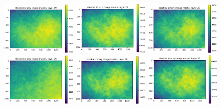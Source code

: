 \documentclass[letterpaper,11pt]{article}
\begin{document}
\begin{figure}[!ht]
\includegraphics[width=0.32\textwidth]{images/measuring_flatfield_corrections/mask_stack_layers_vectra/mask_stack_layer_19}
\includegraphics[width=0.32\textwidth]{images/measuring_flatfield_corrections/mask_stack_layers_vectra/mask_stack_layer_22}
\includegraphics[width=0.32\textwidth]{images/measuring_flatfield_corrections/mask_stack_layers_vectra/mask_stack_layer_25}
\includegraphics[width=0.32\textwidth]{images/measuring_flatfield_corrections/mask_stack_layers_vectra/mask_stack_layer_26}
\includegraphics[width=0.32\textwidth]{images/measuring_flatfield_corrections/mask_stack_layers_vectra/mask_stack_layer_29}
\includegraphics[width=0.32\textwidth]{images/measuring_flatfield_corrections/mask_stack_layers_vectra/mask_stack_layer_32}

\end{figure}
\end{document}
